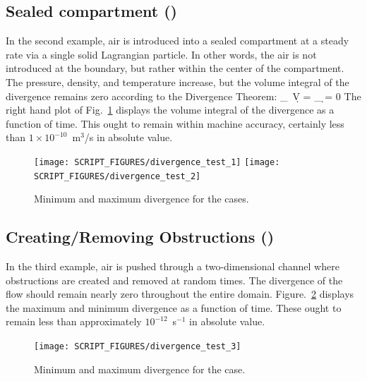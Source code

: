 \documentclass[11pt]{book}
\begin{document}
\subsection{Sealed compartment (\texorpdfstring{}{divergence\_test\_2})}
\label{divergence_test_2}

In the second example, air is introduced into a sealed compartment at a steady rate via a single solid Lagrangian particle. In other words, the air is not introduced at the boundary, but rather within the center of the compartment. The pressure, density, and temperature increase, but the volume integral of the divergence remains zero according to the Divergence Theorem:
\be
   \int_\Omega \nabla \cdot \bu \, \d V = \int_{\partial \Omega} \bu \cdot \d \bS = 0
\ee
The right hand plot of Fig.~\ref{divergence_test_fig} displays the volume integral of the divergence as a function of time. This ought to remain within machine accuracy, certainly less than $1 \times 10^{-10}$~m$^3$/s in absolute value.

\begin{figure}[!ht]
\texttt{[image: SCRIPT\_FIGURES/divergence\_test\_1]}
\texttt{[image: SCRIPT\_FIGURES/divergence\_test\_2]}
\caption[The  cases 1 and 2]{Minimum and maximum divergence for the  cases.}
\label{divergence_test_fig}
\end{figure}

\subsection{Creating/Removing Obstructions (\texorpdfstring{}{divergence\_test\_3})}
\label{divergence_test_3}

In the third example, air is pushed through a two-dimensional channel where obstructions are created and removed at random times. The divergence of the flow should remain nearly zero throughout the entire domain. Figure.~\ref{divergence_test_3_fig} displays the maximum and minimum divergence as a function of time. These ought to remain less than approximately $10^{-12}$~s$^{-1}$ in absolute value.

\begin{figure}[!ht]
\centering
\texttt{[image: SCRIPT\_FIGURES/divergence\_test\_3]}
\caption[The  case 3]{Minimum and maximum divergence for the  case.}
\label{divergence_test_3_fig}
\end{figure}
\end{document}
